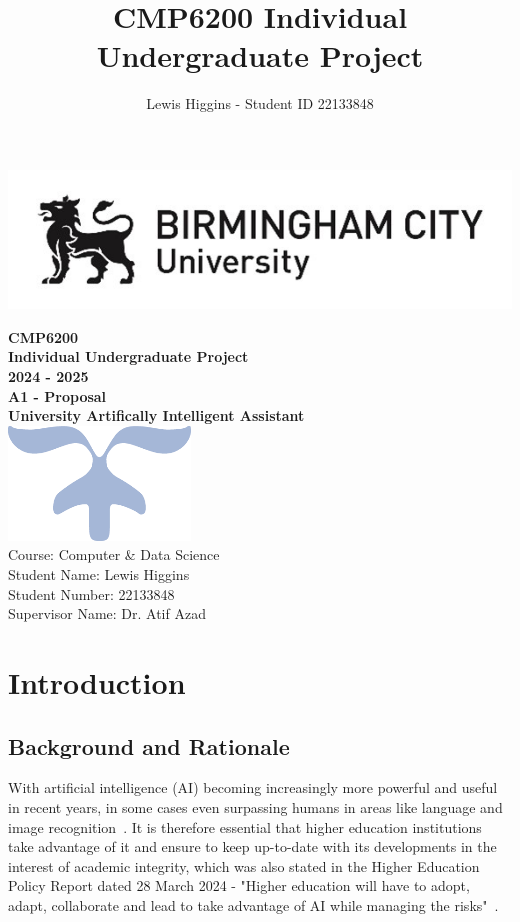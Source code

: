 \documentclass[12pt]{report}
\title{CMP6200 Individual Undergraduate Project}
\author{Lewis Higgins - Student ID 22133848}
\begin{document}
    \makeatletter
    \begin{titlepage}
        \includegraphics[width=0.3\linewidth]{BCUWide.jpg}\\[4ex]
        \vspace{1cm}
        \begin{center}
            {\huge \bfseries  CMP6200}\\[2ex]
            {\huge \bfseries  Individual Undergraduate Project}\\[2ex]
            {\huge \bfseries 2024 - 2025}\\[6ex]
            {\large \bfseries A1 - Proposal}\\[10ex]
            {\huge \bfseries University Artifically Intelligent Assistant}\\[6ex]
            \includegraphics[width=0.1\linewidth]{Symbol.png}\\[50ex]
            Course: Computer \& Data Science\\
            Student Name: Lewis Higgins\\
            Student Number: 22133848\\
            Supervisor Name: Dr. Atif Azad
        \end{center}
    \end{titlepage}
    \makeatother
    \thispagestyle{empty}
    \newpage

    \tableofcontents

    \chapter{Introduction}\label{ch:introduction}
    \section{Background and Rationale}
    With artificial intelligence (AI) becoming increasingly more powerful and useful in 
    recent years, in some cases even surpassing humans in areas like language and image 
    recognition~\autocite{owid-artificial-intelligence}. It is therefore essential that 
    higher education institutions take advantage of it and ensure to keep up-to-date with its
    developments in the interest of academic integrity, which was also stated in the 
    Higher Education Policy Report dated 28 March 2024 - "Higher education will have to adopt,
    adapt, collaborate and lead to take advantage of AI while managing the risks"~\autocite{AIUni}.\\
    
\end{document}
